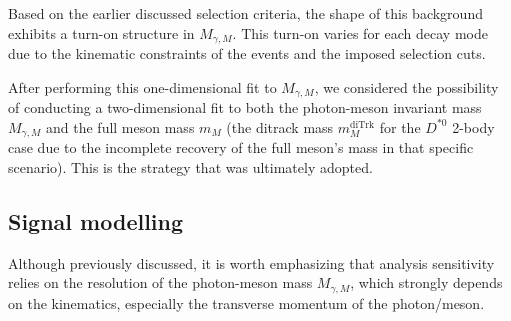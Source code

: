 Based on the earlier discussed selection criteria, the shape of this background exhibits a turn-on structure in $M_{\gamma, M}$. This turn-on varies for each decay mode due to the kinematic constraints of the events and the imposed selection cuts.

After performing this one-dimensional fit to $M_{\gamma, M}$, we considered the possibility of conducting a two-dimensional fit to both the photon-meson invariant mass $M_{\gamma, M}$ and the full meson mass $m_{M}$ (the ditrack mass $m^{\text{diTrk}}_{M}$ for the $D^{*0}$ 2-body case due to the incomplete recovery of the full meson's mass in that specific scenario). This is the strategy that was ultimately adopted.

\subsection*{Signal modelling}

Although previously discussed, it is worth emphasizing that analysis sensitivity relies on the resolution of the photon-meson mass $M_{\gamma, M}$, which strongly depends on the kinematics, especially the transverse momentum of the photon/meson.


